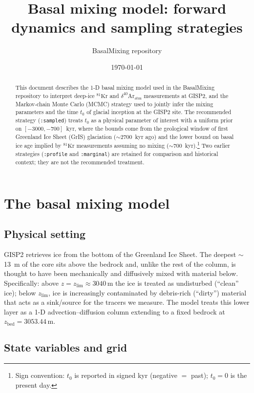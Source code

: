 \documentclass[11pt,a4paper]{article}
\title{Basal mixing model: forward dynamics and sampling strategies}
\author{BasalMixing repository}
\date{\today}
\newcommand{\Kr}{\ensuremath{{}^{81}\mathrm{Kr}}}
\newcommand{\Ar}{\ensuremath{\delta^{40}\mathrm{Ar}_{\mathrm{atm}}}}
\newcommand{\tzero}{\ensuremath{t_{0}}}
\newcommand{\code}[1]{\texttt{#1}}
\begin{document}
\maketitle

\begin{abstract}
\noindent
This document describes the 1-D basal mixing model used in the BasalMixing
repository to interpret deep-ice \Kr{} and \Ar{} measurements at GISP2, and
the Markov-chain Monte Carlo (MCMC) strategy used to jointly infer the
mixing parameters and the time \tzero{} of glacial inception at the GISP2
site. The recommended strategy (\code{:sampled}) treats \tzero{} as a
physical parameter of interest with a uniform prior on $[-3000, -700]$~kyr,
where the bounds come from the geological window of first Greenland Ice
Sheet (GrIS) glaciation ($\sim$2700~kyr ago) and the lower bound on basal
ice age implied by \Kr{} measurements assuming no mixing
($\sim$700~kyr).\footnote{Sign convention: \tzero{} is reported in signed
kyr (negative $=$ past); $\tzero=0$ is the present day.} Two earlier
strategies (\code{:profile} and \code{:marginal}) are retained for
comparison and historical context; they are not the recommended treatment.
\end{abstract}

\tableofcontents

\section{The basal mixing model}
\label{sec:model}

\subsection{Physical setting}

GISP2 retrieves ice from the bottom of the Greenland Ice Sheet. The deepest
$\sim$13~m of the core sits above the bedrock and, unlike the rest of the
column, is thought to have been mechanically and diffusively mixed with
material below. Specifically: above $z=z_{\mathrm{lim}}\approx 3040\,\mathrm{m}$
the ice is treated as undisturbed (``clean'' ice); below $z_{\mathrm{lim}}$,
ice is increasingly contaminated by debris-rich (``dirty'') material that
acts as a sink/source for the tracers we measure. The model treats this lower
layer as a 1-D advection--diffusion column extending to a fixed bedrock at
$z_{\mathrm{bed}}=3053.44\,\mathrm{m}$.

\subsection{State variables and grid}
\end{document}
